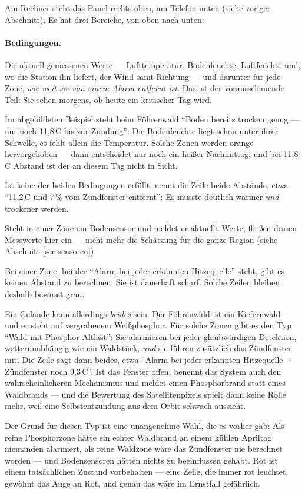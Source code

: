 \documentclass[11pt,a4paper,DIV=12,parskip=half]{scrartcl}
\begin{document}
Am Rechner steht das Panel rechts oben, am Telefon unten (siehe voriger
Abschnitt). Es hat drei Bereiche, von oben nach unten:

\paragraph{Bedingungen.} Die aktuell gemessenen Werte --- Lufttemperatur,
Bodenfeuchte, Luftfeuchte und, wo die Station ihn liefert, der Wind samt
Richtung --- und darunter für jede Zone, \emph{wie weit sie von einem Alarm
entfernt ist}. Das ist der vorausschauende Teil: Sie sehen
morgens, ob heute ein kritischer Tag wird.

Im abgebildeten Beispiel steht beim Föhrenwald \enquote{Boden bereits trocken
genug --- nur noch 11{,}8\,\textdegree C bis zur Zündung}: Die Bodenfeuchte
liegt schon unter ihrer Schwelle, es fehlt allein die Temperatur. Solche Zonen
werden orange hervorgehoben --- dann entscheidet nur noch ein heißer
Nachmittag, und bei 11{,}8\,\textdegree C Abstand ist der an diesem Tag nicht
in Sicht.

Ist keine der beiden Bedingungen erfüllt, nennt die Zeile beide Abstände, etwa
\enquote{11{,}2\,\textdegree C und 7\,\% vom Zündfenster entfernt}: Es
müsste deutlich wärmer \emph{und} trockener werden.

Steht in einer Zone ein Bodensensor und meldet er aktuelle Werte, fließen
dessen Messwerte hier ein --- nicht mehr die Schätzung für die ganze Region
(siehe Abschnitt \ref{sec:sensoren}).

Bei einer Zone, bei der \enquote{Alarm bei jeder erkannten Hitzequelle}
steht, gibt es keinen Abstand zu berechnen: Sie ist dauerhaft scharf. Solche
Zeilen bleiben deshalb bewusst grau.

Ein Gelände kann allerdings \emph{beides} sein. Der Föhrenwald ist ein
Kiefernwald --- und er steht auf vergrabenem Weißphosphor. Für solche Zonen
gibt es den Typ \enquote{Wald mit Phosphor-Altlast}: Sie alarmieren bei jeder
glaubwürdigen Detektion, wetterunabhängig wie ein Waldstück, \emph{und} sie
führen zusätzlich das Zündfenster mit. Die Zeile sagt dann beides, etwa
\enquote{Alarm bei jeder erkannten Hitzequelle · Zündfenster noch
9{,}3\,\textdegree C}. Ist das Fenster offen, benennt das System auch den
wahrscheinlicheren Mechanismus und meldet einen Phosphorbrand statt eines
Waldbrands --- und die Bewertung des Satellitenpixels spielt dann keine Rolle
mehr, weil eine Selbstentzündung aus dem Orbit schwach aussieht.

Der Grund für diesen Typ ist eine unangenehme Wahl, die es vorher gab: Als
reine Phosphorzone hätte ein echter Waldbrand an einem kühlen Apriltag
niemanden alarmiert, als reine Waldzone wäre das Zündfenster nie berechnet
worden --- und Bodensensoren hätten nichts zu beeinflussen gehabt. Rot ist einem tatsächlichen Zustand
vorbehalten --- eine Zeile, die immer rot leuchtet, gewöhnt das Auge an Rot,
und genau das wäre im Ernstfall gefährlich.
\end{document}
